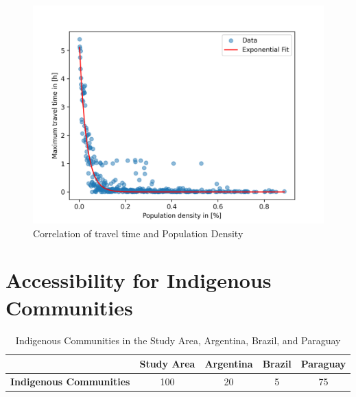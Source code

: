 \documentclass[11pt, a4paper]{report}
\begin{document}
\begin{figure}[H]
  \centering
  \includegraphics[width=0.9\linewidth]{figures/correlation.png}
  \caption{Correlation of travel time and Population Density}
  \label{fig:correlation}
\end{figure}

\section{Accessibility for Indigenous Communities}\label{sec:results:indigenous}

\begin{table}[h!]
\caption{Indigenous Communities in the Study Area, Argentina, Brazil, and Paraguay}
\centering
\begin{tabular}{|l|c|c|c|c|}
\hline
\textbf{} & \textbf{Study Area} & \textbf{Argentina} & \textbf{Brazil} & \textbf{Paraguay} \\ 
\hline
\textbf{Indigenous Communities }& 100& 20& 5& 75\\\hline
\end{tabular}
\label{table:indigenouscommunities}
\end{table}
\end{document}
